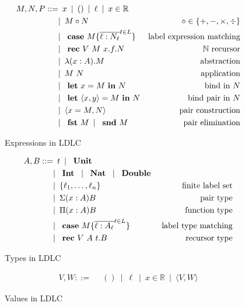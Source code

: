 \begin{figure}
\begin{align*}
 M,N,P ::=
    & \enspace x \enspace|\enspace
      () \enspace|\enspace
      \ell \enspace|\enspace
      x \in \mathbb{R} \\
    & |\enspace M \circ N & \circ \in \{+,-,\times,\div\} \\
    & |\enspace \text{ \textbf{case} } M \{\overline{\ell : N_\ell}^{\ell \in L} \} & \text{label expression matching} \\
    & |\enspace \text{ \textbf{rec} } V~M~x.f.N & \mathbb{N}\text{ recursor} \\
    & |\enspace \lambda (x : A).M & \text{abstraction} \\
    & |\enspace M~N & \text{application}\\
    & |\enspace \text{ \textbf{let} } x = M \text{ \textbf{in} } N & \text{bind in $N$}\\
    & |\enspace \text{ \textbf{let} } \langle x, y \rangle = M \text{ \textbf{in} } N & \text{bind pair in $N$} \\
    & |\enspace \langle x = M, N \rangle & \text{pair construction}\\
    & |\enspace \text{ \textbf{fst} } M \enspace|\enspace \text{ \textbf{snd} } M & \text{pair elimination}
\end{align*}
\caption{Expressions in LDLC}
\label{fig:ldlc-expressions}
\end{figure}

\begin{figure}
\begin{align*}
 A, B ::=
    & \enspace t \enspace|\enspace
      \text{ \textbf{Unit} }
    \\ &  |\enspace \text{ \textbf{Int} } \enspace|\enspace
      \text{ \textbf{Nat} } \enspace|\enspace
      \text{ \textbf{Double} } \\
    & |\enspace \{ \ell_1, \dots, \ell_n \} & \text{finite label set} \\
    & |\enspace \Sigma(x:A)B & \text{pair type} \\
    & |\enspace \Pi(x:A)B & \text{function type} \\
    & |\enspace \text{ \textbf{case} } M \{\overline{\ell : A_\ell}^{\ell \in L} \} & \text{label type matching} \\
    & |\enspace \text{ \textbf{rec} } V~A~t.B & \text{recursor type}
\end{align*}
\caption{Types in LDLC}
\label{fig:ldlc-types}
\end{figure}

\begin{figure}
\begin{align*}
    V, W ::=
    & \enspace () \enspace|\enspace
      \ell \enspace|\enspace
      x \in \mathbb{R} \enspace
     |\enspace \langle V, W \rangle
\end{align*}
\caption{Values in LDLC}
\label{fig:ldlc-values}
\end{figure}

